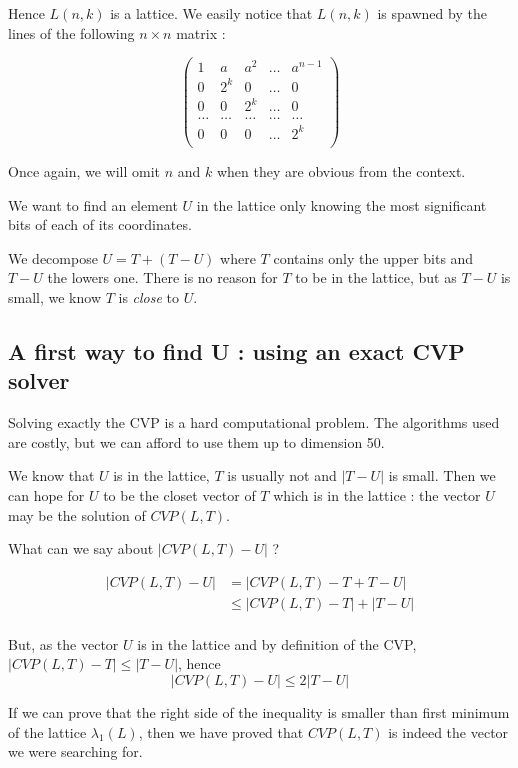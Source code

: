 \documentclass[preprint,svgnames]{iacrtrans}
\begin{document}
Hence \(L(n,k)\) is a lattice. We easily notice that \(L(n,k)\) is spawned by the lines of the following \(n\times n\) matrix :

\[\begin{pmatrix}
1&a&a^2&\dots&a^{n-1}\\
0&2^k&0&\dots&0\\
0&0&2^k&\dots&0\\
\dots&\dots&\dots&\dots&\dots\\
0&0&0&\dots&2^k\\
\end{pmatrix}\]

Once again, we will omit $n$ and $k$ when they are obvious from the context.

We want to find an element \(U\) in the lattice only knowing the most significant bits of each of its coordinates. 

We decompose \(U = T + (T-U)\) where \(T\) contains only the upper bits and \(T-U\) the lowers one. There is no reason for \(T\) to be in the lattice, but as \(T-U\) is small, we know \(T\) is \emph{close} to \(U\).

\subsection{A first way to find U : using an exact CVP solver}

Solving exactly the CVP is a hard computational problem. The algorithms used are costly, but we can afford to use them up to dimension 50.

We know that \(U\) is in the lattice, \(T\) is usually not and \(|T-U|\) is small. Then we can hope for \(U\) to be the closet vector of \(T\) which is in the lattice : the vector \(U\) may be the solution of \(CVP(L,T)\).

What can we say about \(|CVP(L,T)-U|\) ?

\begin{align*}
|CVP(L,T)-U| &= |CVP(L,T)-T+T-U|\\
& \leqslant |CVP(L,T)-T|+|T-U|\\
\end{align*}

But, as the vector \(U\) is in the lattice and by definition of the CVP, \(|CVP(L,T)-T| \leqslant |T-U| \), hence 
\[|CVP(L,T)-U|\leqslant 2|T-U|\]

If we can prove that the right side of the inequality is smaller than first minimum of the lattice \(\lambda_1(L)\), then we have proved that \(CVP(L,T)\) is indeed the vector we were searching for.
\end{document}
